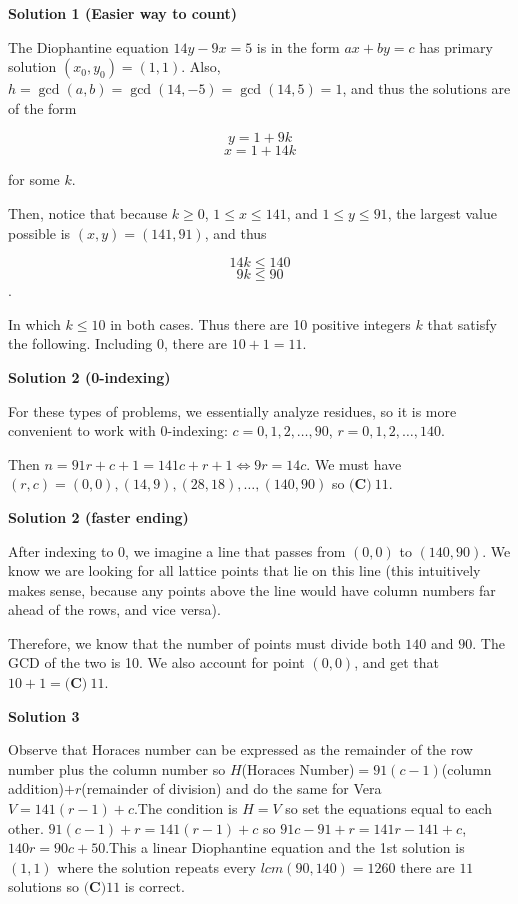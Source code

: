 \begin{enumerate}
 



\textbf{Solution 1 (Easier way to count)}

The Diophantine equation $14y-9x=5$ is in the form $ax+by = c$ has primary solution $(x_0, y_0) = (1,1)$. Also, $h = \gcd(a,b) =\gcd(14, -5) = \gcd(14,5) = 1$, and thus the solutions are of the form

 
 \[y = 1 + 9k\]
 \[x = 1 + 14k\]

 for some $k$.

 Then, notice that because $k \ge 0$, $1 \le x \le 141$, and $1 \le y \le 91$, the largest value possible is $(x,y) = (141, 91)$, and thus

 
 \[14k \le 140\]
 \[9k \le 90\].

 In which $k \le 10$ in both cases. Thus there are 10 positive integers $k$ that satisfy the following. Including 0, there are $10 + 1 = \boxed{11}$.

 



\textbf{Solution 2 (0-indexing)}

For these types of problems, we essentially analyze residues, so it is more convenient to work with 0-indexing: $c=0,1,2,\dots,90$, $r=0,1,2,\dots,140$.

 Then $n=91r+c+1=141c+r+1\iff 9r=14c$. We must have $(r,c)=(0,0),(14,9),(28,18),\dots,(140,90)$ so $\boxed{ \textbf{(C)}~11 }$.

 



\textbf{Solution 2 (faster ending)}

After indexing to 0, we imagine a line that passes from $(0,0)$ to $(140,90)$. We know we are looking for all lattice points that lie on this line (this intuitively makes sense, because any points above the line would have column numbers far ahead of the rows, and vice versa). 

 Therefore, we know that the number of points must divide both $140$ and $90$. The GCD of the two is 10. We also account for point $(0,0)$, and get that $10+1=\boxed{ \textbf{(C)}~11 }$.

 



\textbf{Solution 3}

Observe that Horaces number can be expressed as the remainder of the row number plus the column number so $H$(Horaces Number)$=91(c-1)$(column addition)$+r$(remainder of division) and do the same for Vera $V=141(r-1)+c$.The condition is $H=V$ so set the equations equal to each other. $91(c-1)+r=141(r-1)+c$ so $91c-91+r=141r-141+c$,$140r=90c+50$.This a linear Diophantine equation and the 1st solution is $(1,1)$ where the solution repeats every $lcm(90,140)=1260$ there are $11$ solutions so $\boxed{\textbf{(C)}11}$ is correct.


\end{enumerate}
